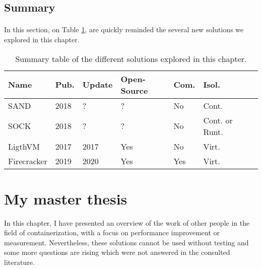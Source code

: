 \subsection{Summary}
\paragraph{}In this section, on Table \ref{tab:summary}, are quickly reminded the several new solutions we explored in this chapter.
\begin{table}[!h]

  \begin{center}
    \begin{tabular}{|p{}|p{}|p{}|p{}|p{}|p{}|p{}|}
       \hline
       \textbf{Name} & \textbf{Pub.}\footnotemark & \textbf{Update}\footnotemark & \textbf{Open-Source} & \textbf{Com.}\footnotemark & \textbf{Isol.}\footnotemark \\
       \hline
       SAND\cite{akkus2018sand} & 2018 & ? & ? & No & Cont. \\
       \hline
       SOCK\cite{oakes2018sock} & 2018 & ? & ? & No & Cont. or Runt. \\
       \hline
       LigthVM\cite{manco2017my} & 2017 & 2017 & Yes & No & Virt. \\
       \hline
       Firecracker\cite{agachefirecracker} & 2019 & 2020 & Yes & Yes & Virt.\\
       \hline
    \end{tabular}
  \end{center}
  \caption{Summary table of the different solutions explored in this chapter.}
  \label{tab:summary}
\end{table}

\section{My master thesis}
In this chapter, I have presented an overview of the work of other people in the field of containerization, with a focus on performance improvement or measurement.  Nevertheless, these solutions cannot be used without testing and some more questions are rising which were not answered in the consulted literature.

